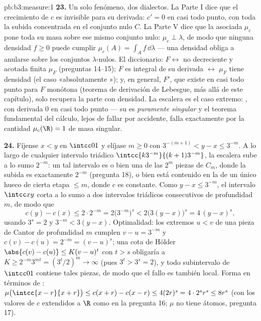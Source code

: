 \begin{solution}{pb:b3:measure:1}
\textbf{23.} Un solo fenómeno, dos dialectos. La Parte I dice que el
crecimiento de $c$ es invisible para su derivada: $c' = 0$ en casi todo
punto, con toda la subida concentrada en el conjunto nulo $C$. La Parte
V dice que la  asociada $\mu_c$
pone toda su masa sobre ese mismo conjunto nulo: $\mu_c \perp \lambda$,
de modo que ninguna densidad $f \geq
0$ puede cumplir $\mu_c(A) = \int_Af\,\dd\lambda$ --- una densidad
obliga a anularse sobre los conjuntos $\lambda$-nulos. El diccionario:
$F \leftrightarrow$ no decreciente y acotada
 finita $\mu_F$ (preguntas
14--15); $F$ es integral de su derivada $\leftrightarrow$ $\mu_F$ tiene
densidad (el caso «absolutamente
»); y, en general, $F'$,
que existe en casi todo punto para $F$ monótona (teorema de derivación
de Lebesgue, más allá de este capítulo), solo recupera la parte con
densidad. La escalera es el caso extremo:
, con derivada $0$ en casi
todo punto --- su  es
\emph{puramente singular} y el teorema fundamental del cálculo, lejos de
fallar por accidente, falla exactamente por la cantidad $\mu_c(\R) = 1$
de masa singular.

\textbf{24.} Fíjense $x < y$ en $\intcc01$ y elíjase $m \geq 0$ con
$3^{-(m+1)} < y - x \leq 3^{-m}$. A lo largo de cualquier intervalo
triádico $\intcc{k3^{-m}}{(k+1)3^{-m}}$, la escalera sube a lo sumo
$2^{-m}$: un tal intervalo es o bien una de las $2^m$ piezas de $C_m$,
donde la subida es exactamente $2^{-m}$ (pregunta 18), o bien está
contenido en la  de un único
hueco de cierta etapa $\leq m$, donde $c$ es constante. Como $y - x \leq
3^{-m}$, el intervalo $\intcc xy$ corta a lo sumo a dos intervalos
triádicos consecutivos de profundidad $m$, de modo que
\[
c(y) - c(x) \leq 2\cdot2^{-m}
= 2\bigl(3^{-m}\bigr)^{s}
< 2\bigl(3(y - x)\bigr)^{s}
= 4\,(y - x)^{s},
\]
usando $3^{s} = 2$ y $3^{-m} < 3(y - x)$. Optimalidad: los extremos
$u < v$ de una pieza de Cantor de profundidad $m$ cumplen $v - u =
3^{-m}$ y $c(v) - c(u) = 2^{-m} = (v - u)^{s}$; una cota de Hölder
$\abs{c(v) - c(u)} \leq K(v - u)^{t}$ con $t > s$ obligaría a
$K \geq 2^{-m}3^{mt} = (3^{t}/2)^{m} \to \infty$ (pues
$3^{t} > 3^{s} = 2$), y todo subintervalo de $\intcc01$ contiene tales
piezas, de modo que el fallo es también local. Forma en términos de
:
$\mu\bigl(\intcc{x-r}{x+r}\bigr) \leq
c(x + r) - c(x - r) \leq 4(2r)^{s} = 4\cdot2^{s}r^{s} \leq
8r^{s}$ (con los valores de $c$ extendidos a $\R$ como en la pregunta
16; $\mu$ no tiene átomos, pregunta 17).


\end{solution}

